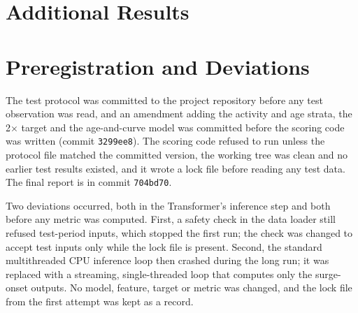 \section{Additional Results}
\label{app:extra}

\begin{table}[h]
\centering
\caption{All baselines on the validation week. Alert lift is the hourly top-ten precision divided by the base rate. Confidence intervals for the champion's PR-AUC advantage were computed for the 300-second horizon.}
\label{tab:baselines}
\tabsize
\setlength{\tabcolsep}{4pt}

\end{table}

\begin{table}[h]
\centering
\caption{Test-week ROC-AUC by stratum, 300-second horizon.}
\label{tab:strata300}
\tabsize
\setlength{\tabcolsep}{4pt}

\end{table}

\begin{table}[h]
\centering
\caption{Validation-week ROC-AUC among active tokens (60-second horizon), for comparison with Table~\ref{tab:strata}.}
\label{tab:valstrata}
\tabsize

\end{table}

\section{Preregistration and Deviations}
\label{app:prereg}

The test protocol was committed to the project repository before any test observation was read, and an amendment adding the activity and age strata, the 2$\times$ target and the age-and-curve model was committed before the scoring code was written (commit \texttt{3299ee8}). The scoring code refused to run unless the protocol file matched the committed version, the working tree was clean and no earlier test results existed, and it wrote a lock file before reading any test data. The final report is in commit \texttt{704bd70}.

Two deviations occurred, both in the Transformer's inference step and both before any metric was computed. First, a safety check in the data loader still refused test-period inputs, which stopped the first run; the check was changed to accept test inputs only while the lock file is present. Second, the standard multithreaded CPU inference loop then crashed during the long run; it was replaced with a streaming, single-threaded loop that computes only the surge-onset outputs. No model, feature, target or metric was changed, and the lock file from the first attempt was kept as a record.
